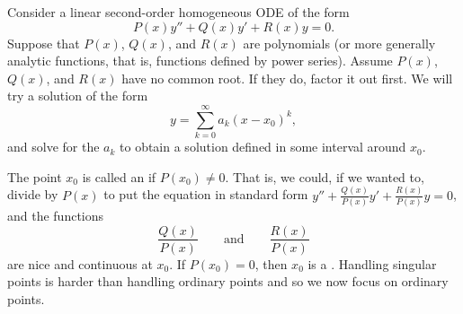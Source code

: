 
Consider a linear second-order homogeneous ODE of the form
\begin{equation*}
P(x) y'' + Q(x) y' + R(x) y = 0 .
\end{equation*}
Suppose that $P(x)$, $Q(x)$, and $R(x)$ are polynomials (or
more generally analytic functions, that is, functions defined by power
series).  Assume $P(x)$, $Q(x)$, and $R(x)$ have no common root.  If they do,
factor it out first.  We will 
try a solution of the form
\begin{equation*}
y = \sum_{k=0}^\infty a_k {(x-x_0)}^k ,
\end{equation*}
and solve for the $a_k$ to obtain a solution defined in some
interval around $x_0$.

The point $x_0$ is called an \emph{}
if $P(x_0) \neq 0$.  That is,
we could, if we wanted to, 
divide by $P(x)$ to put the equation in standard form
$y'' + \frac{Q(x)}{P(x)} y' + \frac{R(x)}{P(x)} y = 0$,
and the functions
\begin{equation*}
\frac{Q(x)}{P(x)} \qquad \text{and} \qquad \frac{R(x)}{P(x)}
\end{equation*}
are nice and continuous at $x_0$.
If $P(x_0) = 0$, then $x_0$
is a \emph{}.  Handling singular points is
harder than handling ordinary points and so we now focus on ordinary points.

